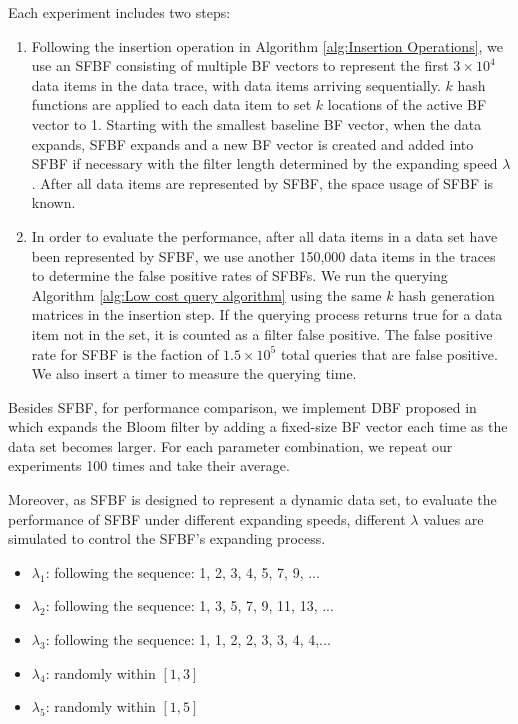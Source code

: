 \documentclass[10pt,journal,compsoc]{IEEEtran}
\begin{document}
Each experiment includes two steps:
\begin{enumerate}

\item Following the insertion operation in Algorithm \ref{alg:Insertion Operations}, we use an SFBF consisting of multiple BF vectors to represent the first $3 \times 10^4$ data items in the data trace, with data items  arriving sequentially.  $k$ hash functions are applied to each data item to set $k$ locations of the active BF vector to 1. Starting with the smallest baseline BF vector, when the data expands, SFBF expands and a new BF vector is created and added into SFBF if necessary with the filter length determined by the expanding speed $\lambda$. %
    After all data items are represented by SFBF, the space usage of SFBF is known.

\item In order to evaluate the performance, after all data items in a data set have been represented by SFBF, we use another 150,000 data items in the traces to determine the false positive rates of SFBFs.  We run the querying Algorithm \ref{alg:Low cost query algorithm} using the same $k$ hash generation matrices in the insertion step. If the querying process returns true for a data item not in the set, it is counted as a filter false positive. The false positive rate for SFBF is the faction of $1.5 \times 10^5$ total queries that are false positive. We also insert a timer to measure the querying time.
\end{enumerate}



Besides SFBF, for performance comparison, we implement DBF proposed in~\cite{guo2006theory} which expands
the Bloom filter by adding a fixed-size BF vector each time as the data set becomes larger.  For each parameter combination, we repeat our experiments 100 times and take their average.

Moreover, as SFBF is designed to represent a dynamic data set, to evaluate the performance of SFBF under different expanding speeds, different $\lambda $ values are simulated to control the SFBF's expanding process.

\begin{itemize}
  \item $\lambda_1$: following the sequence: 1, 2, 3, 4, 5, 7, 9, ...
  \item $\lambda_2$: following the sequence: 1, 3, 5, 7, 9, 11, 13, ...
  \item $\lambda_3$: following the sequence: 1, 1, 2, 2, 3, 3, 4, 4,...
  \item $\lambda_4$: randomly  within $[1,3]$
  \item $\lambda_5$: randomly  within $[1,5]$
\end{itemize}
\end{document}
